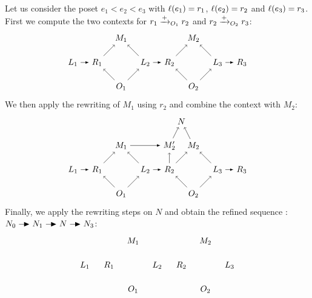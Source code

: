 \begin{example}
\label{ex:e1e2e3}
Let us consider the poset $e_1<e_2<e_3$ with $\ell(e_1)=r_1$, $\ell(e_2)=r_2$ and $\ell(e_3)=r_3$. First we compute the two contexts for $r_1\mathrel{\xrightarrow{+}}_{O_1} r_2$ and $r_2\mathrel{\xrightarrow{+}}_{O_2} r_3$:
\[
\begin{tikzpicture} %
  \node (o1) at (0,-1) {\(O_1\)};
  \node (m1) at (0,1) {\(M_1\)};
  \node (r1) at (-1,0) {\(R_1\)};
  \node (l1) at (-2,0) {\(L_1\)};
  \node (l2) at (1,0) {\(L_2\)};
  \node (r2) at (2,0) {\(R_2\)};
  \node (o2) at (3,-1) {\(O_2\)};
  \node (m2) at (3,1) {\(M_2\)};
  \node (l3) at (4,0) {\(L_3\)};
  \node (r3) at (5,0) {\(R_3\)};
  \draw [->] (o1) -- (r1);
  \draw [->] (o1) -- (l2);
  \draw [->] (r1) -- (m1);
  \draw [->] (l2) -- (m1);
  \draw [->] (o2) -- (r2);
  \draw [->] (o2) -- (l3);
  \draw [->] (r2) -- (m2);
  \draw [->] (l3) -- (m2);
  \draw [>=latex, ->] (l1) -- (r1);
  \draw [>=latex, ->] (l2) -- (r2);
  \draw [>=latex, ->] (l3) -- (r3);
\end{tikzpicture}
\]
We then apply the rewriting of $M_1$ using $r_2$ and combine the context with $M_2$:
\[
\begin{tikzpicture} %
  \node (o1) at (0,-1) {\(O_1\)};
  \node (m1) at (0,1) {\(M_1\)};
  \node (r1) at (-1,0) {\(R_1\)};
  \node (l1) at (-2,0) {\(L_1\)};
  \node (l2) at (1,0) {\(L_2\)};
  \node (r2) at (2,0) {\(R_2\)};
  \node (o2) at (3,-1) {\(O_2\)};
  \node (m2) at (3,1) {\(M_2\)};
  \node (l3) at (4,0) {\(L_3\)};
  \node (r3) at (5,0) {\(R_3\)};
  \node (m2p) at (2,1) {\(M_2'\)};
  \node (n) at (2.5,2) {\(N\)};
  \draw [->] (o1) -- (r1);
  \draw [->] (o1) -- (l2);
  \draw [->] (r1) -- (m1);
  \draw [->] (l2) -- (m1);
  \draw [->] (o2) -- (r2);
  \draw [->] (o2) -- (l3);
  \draw [->] (r2) -- (m2);
  \draw [->] (l3) -- (m2);
  \draw [->] (m2) -- (n);
  \draw [->] (m2p) -- (n);
  \draw [->] (r2) -- (m2p);
  \draw [>=latex, ->] (l1) -- (r1);
  \draw [>=latex, ->] (l2) -- (r2);
  \draw [>=latex, ->] (l3) -- (r3);
  \draw [>=latex, ->] (m1) -- (m2p);
\end{tikzpicture}
\]
Finally, we apply the rewriting steps on $N$ and obtain the refined sequence : $N_0\action N_1\action N\action N_3$:
\[
\begin{tikzpicture} %
  \node (o1) at (0,-1) {\(O_1\)};
  \node (m1) at (0,1) {\(M_1\)};
  \node (r1) at (-1,0) {\(R_1\)};
  \node (l1) at (-2,0) {\(L_1\)};
  \node (l2) at (1,0) {\(L_2\)};
  \node (r2) at (2,0) {\(R_2\)};
  \node (o2) at (3,-1) {\(O_2\)};
  \node (m2) at (3,1) {\(M_2\)};
  \node (l3) at (4,0) {\(L_3\)};

\end{tikzpicture}\]
\end{example}
